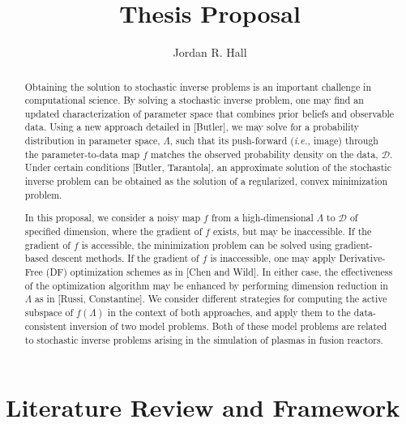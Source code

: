\documentclass{amsart}
\begin{document}
\begin{abstract}

Obtaining the solution to stochastic inverse problems is an important challenge in computational science. By solving a stochastic inverse problem, one may find an updated  characterization of parameter space that combines  prior beliefs and observable data. Using a new approach detailed in [Butler], we may solve for a probability distribution in parameter space, $\Lambda$, such that its push-forward (\emph{i.e.,} image) through the parameter-to-data map $f$ matches the observed probability density on the data, $\mathcal{D}$. Under certain conditions [Butler, Tarantola], an approximate solution of the stochastic inverse problem can be obtained as the solution of a regularized, convex minimization problem.
  
In this proposal, we consider a noisy map $f$ from a high-dimensional $\Lambda$ to $\mathcal{D}$ of specified dimension, where the gradient of $f$ exists, but may be inaccessible. If the gradient of $f$ is accessible, the minimization problem can be solved using gradient-based descent methods. If the gradient of $f$ is inaccessible, one may apply Derivative-Free (DF) optimization schemes as in [Chen and Wild]. In either case,  the effectiveness of the optimization algorithm may be enhanced by performing dimension reduction in $\Lambda$ as in [Russi, Constantine]. We consider different strategies for computing the active subspace of $f(\Lambda)$ in the context of both approaches, and apply them to the data-consistent inversion of two model problems. Both of these model problems are related to stochastic inverse problems arising in the simulation of plasmas in fusion reactors.
 

\end{abstract}


\title{Thesis Proposal}

\author{Jordan R. Hall}

\maketitle



\tableofcontents

\setcounter{tocdepth}{0}




\newpage

\section{Literature Review and Framework}
\end{document}
